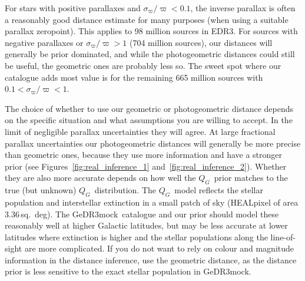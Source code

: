 \documentclass[twocolumn]{aastex62}
\providecommand{\mock}{GeDR3mock}
\providecommand{\release}{EDR3}
\providecommand{\QG}{\ensuremath{Q_G}}
\providecommand{\parallax}{\ensuremath{\varpi}}
\providecommand{\sigparallax}{\ensuremath{\sigma_{\varpi}}}
\providecommand{\fpu}{\ensuremath{\sigparallax/\parallax}}
\begin{document}
For stars with positive parallaxes and $\fpu < 0.1$, the inverse parallax is often a reasonably good distance estimate for many purposes (when using a suitable parallax zeropoint). This applies to 98 million sources in \release. For sources with negative parallaxes or $\fpu > 1$ (704 million sources), our distances will generally be prior dominated, and while the photogeometric distances could still be useful, the geometric ones are probably less so. The sweet spot where our catalogue adds most value is for the remaining 665 million sources with $0.1 < \fpu < 1$.

The choice of whether to use our geometric or photogeometric distance depends on the specific situation and what assumptions you are willing to accept.
In the limit of negligible parallax uncertainties they will agree. %
At large fractional parallax uncertainties our photogeometric distances will generally be more precise than geometric ones, because they use more information and have a stronger prior (see Figures~\ref{fig:real_inference_1} and~\ref{fig:real_inference_2}). Whether they are also more accurate depends on how well the \QG\ prior matches to the true (but unknown) \QG\ distribution. The \QG\ model reflects the stellar population and interstellar extinction in a small patch of sky (HEALpixel of area 3.36\,sq.~deg). The \mock\ catalogue and our prior should model these reasonably well at  higher Galactic latitudes, but may be less accurate at lower latitudes where extinction is higher and the stellar populations along the line-of-sight are more complicated. If you do not want to rely on colour and magnitude information in the distance inference, use the geometric distance, as the distance prior is less sensitive to the exact stellar population in \mock. 
\end{document}
